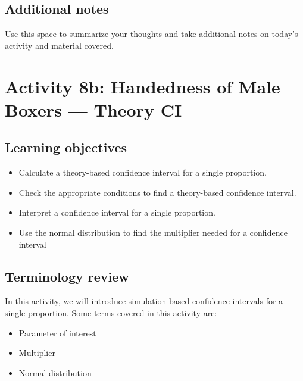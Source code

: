 \documentclass[
]{report}
\begin{document}
\hypertarget{additional-notes-11}{%
\subsection{Additional notes}\label{additional-notes-11}}

Use this space to summarize your thoughts and take additional notes on today's activity and material covered.

\newpage

\hypertarget{activity-8b-handedness-of-male-boxers-theory-ci}{%
\section{Activity 8b: Handedness of Male Boxers --- Theory CI}\label{activity-8b-handedness-of-male-boxers-theory-ci}}


\hypertarget{learning-objectives-10}{%
\subsection{Learning objectives}\label{learning-objectives-10}}

\begin{itemize}
\item
  Calculate a theory-based confidence interval for a single proportion.
\item
  Check the appropriate conditions to find a theory-based confidence interval.
\item
  Interpret a confidence interval for a single proportion.
\item
  Use the normal distribution to find the multiplier needed for a confidence interval
\end{itemize}

\hypertarget{terminology-review-13}{%
\subsection{Terminology review}\label{terminology-review-13}}

In this activity, we will introduce simulation-based confidence intervals for a single proportion. Some terms covered in this activity are:

\begin{itemize}
\item
  Parameter of interest
\item
  Multiplier
\item
  Normal distribution
\end{itemize}
\end{document}
